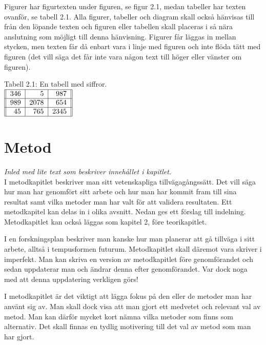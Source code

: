 \documentclass[a4paper,12pt]{article} %
\begin{document}
Figurer har figurtexten under figuren, se figur 2.1, medan tabeller har texten ovanför, se tabell 2.1. Alla figurer, tabeller och diagram skall också hänvisas till från den löpande texten och figuren eller tabellen skall placeras i så nära anslutning som möjligt till denna hänvisning. Figurer får läggas in mellan stycken, men texten får då enbart vara i linje med figuren och inte flöda tätt med figuren (det vill säga det får inte vara någon text till höger eller vänster om figuren). \\

\begin{center} 
Tabell 2.1: En tabell med siffror.\\[0.2cm]

$\begin{tabular} {||r|r|r||} \hline
346 & 5 & 987 \\ \hline
989 & 2078 & 654 \\ \hline
45 & 765 & 2345 \\ \hline
\end{tabular}$
\end{center}

\newpage			

\section{Metod}
\emph{Inled med lite text som beskriver inneh\aa llet i kapitlet.}\\
I metodkapitlet beskriver man sitt vetenskapliga tillvägagångssätt. Det vill säga hur man har genomfört sitt arbete och hur man har kommit fram till sina resultat samt vilka metoder man har valt för att validera resultaten. Ett metodkapitel kan delas in i olika avsnitt. Nedan ges ett förslag till indelning. Metodkapitlet kan också läggas som kapitel 2, före teorikapitlet.

I en forskningsplan beskriver man kanske hur man planerar att gå tillväga i sitt arbete, alltså i tempusformen futurum. Metodkapitlet skall däremot vara skriver i imperfekt. Man kan skriva en version av metodkapitlet före genomförandet och sedan uppdaterar man och ändrar denna efter genomförandet. Var dock noga med att denna uppdatering verkligen görs!

I metodkapitlet är det viktigt att lägga fokus på den eller de metoder man har använt sig av. Man skall dock visa att man gjort ett medvetet och relevant val av metod. Man kan därför mycket kort nämna vilka metoder som finns som alternativ. Det skall finnas en tydlig motivering till det val av metod som man har gjort. 
\end{document}
